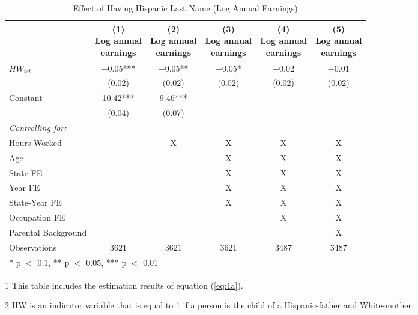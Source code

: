 \begin{table}[H]
\centering\centering
\caption{Effect of Having Hispanic Last Name (Log Annual Earnings) \label{tab:lastnamereg}}
\centering
\begin{threeparttable}
\begin{tabular}[t]{lccccc}
\toprule
  & \specialcell{(1) \\ Log annual \\ earnings} & \specialcell{(2) \\ Log annual \\ earnings} & \specialcell{(3) \\ Log annual \\ earnings} & \specialcell{(4) \\  Log annual \\ earnings} & \specialcell{(5) \\  Log annual \\ earnings}\\
\midrule
$HW_{ist}$ & \num{-0.05}*** & \num{-0.05}** & \num{-0.05}* & \num{-0.02} & \num{-0.01}\\
 & (\num{0.02}) & (\num{0.02}) & (\num{0.02}) & (\num{0.02}) & (\num{0.02})\\
Constant & \num{10.42}*** & \num{9.46}*** &  &  & \\
 & (\num{0.04}) & (\num{0.07}) &  &  & \\
\midrule
\textit{Controlling for:} &  &  &  &  & \\
Hours Worked &  & X & X & X & X\\
Age &  &  & X & X & X\\
State FE &  &  & X & X & X\\
Year FE &  &  & X & X & X\\
State-Year FE &  &  & X & X & X\\
Occupation FE &  &  &  & X & X\\
Parental Background &  &  &  &  & X\\
Observations & \num{3621} & \num{3621} & \num{3621} & \num{3487} & \num{3487}\\
\bottomrule
\multicolumn{6}{l}{\rule{0pt}{1em}* p $<$ 0.1, ** p $<$ 0.05, *** p $<$ 0.01}\\
\end{tabular}
\begin{tablenotes}
\item[1] {\footnotesize{This table includes the estimation results of equation (\ref{eq:1a}).}}
\item[2] {\footnotesize{HW is an indicator variable that is equal to 1 if a person is the child of a Hispanic-father and White-mother.}}

\end{tablenotes}
\end{threeparttable}
\end{table}

